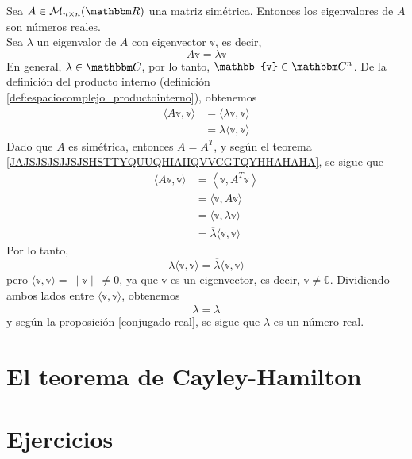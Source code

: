 \begin{theorem}
    Sea $A \in \mathcal{M}_{n \times n}(\RR)$ una matriz simétrica. Entonces los eigenvalores de $A$ son números reales. \\
    \demostracion Sea $\lambda$ un eigenvalor de $A$ con eigenvector $\mathbb{v}$, es decir,
    $$A\mathbb{v} = \lambda \mathbb{v}$$
    En general, $\lambda \in \CC$, por lo tanto, $\mathbb{v} \in \CC[n]$. De la definición del producto interno (definición \ref{def:espaciocomplejo_productointerno}), obtenemos
    \begin{align*}
        \langle A\mathbb{v}, \mathbb{v} \rangle & = \langle \lambda \mathbb{v}, \mathbb{v} \rangle \\
        & = \lambda \langle \mathbb{v}, \mathbb{v} \rangle
    \end{align*}
    Dado que $A$ es simétrica, entonces $A = A^T$, y según el teorema \ref{JAJSJSJSJJSJSHSTTYQUUQHIAIIQVVCGTQYHHAHAHA}, se sigue que
    \begin{align*}
        \langle A\mathbb{v}, \mathbb{v} \rangle & = \left\langle \mathbb{v}, A^T \mathbb{v} \right\rangle \\
        & = \langle \mathbb{v}, A\mathbb{v} \rangle \\
        & = \langle \mathbb{v}, \lambda \mathbb{v} \rangle \\
        & = \overline{\lambda} \langle \mathbb{v}, \mathbb{v} \rangle
    \end{align*}
    Por lo tanto,
    $$\lambda \langle \mathbb{v}, \mathbb{v} \rangle = \overline{\lambda} \langle \mathbb{v}, \mathbb{v} \rangle$$
    pero $\langle \mathbb{v}, \mathbb{v} \rangle = \| \mathbb{v} \| \neq 0$, ya que $\mathbb{v}$ es un eigenvector, es decir, $\mathbb{v} \neq \mathbb{0}$. Dividiendo ambos lados entre $\langle \mathbb{v}, \mathbb{v} \rangle$, obtenemos
    $$\lambda = \overline{\lambda}$$
    y según la proposición \ref{conjugado-real}, se sigue que $\lambda$ es un número real.
\end{theorem}

\section{El teorema de Cayley-Hamilton}

\newpage

\section{Ejercicios}

